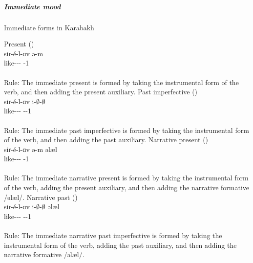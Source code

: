 \subparagraph{Immediate mood}



\begin{exe}
	\ex Immediate forms in Karabakh \label{sent:Karabakh:morpho:verb:Immediate}
	\begin{xlist}
		\ex Present ()\\\gll 
		siɾ-\'e-l-ɑv ə-m \\ 
		like-{\thgloss}-{\infgloss}-{\ins} {\aux}-1{\sg} \\ 
		\trans {}\\
		Rule: The immediate present is formed by taking the instrumental form of the verb, and then adding the present auxiliary. 
		\ex Past imperfective ()\\ \gll 
		siɾ-\'e-l-ɑv i-$\emptyset$-$\emptyset$ \\ 
		like-{\thgloss}-{\infgloss}-{\ins} {\aux}-{\pst}-1{\sg} \\ 
		\trans {}\\
		Rule: The immediate past imperfective is formed by taking the instrumental form of the verb, and then adding the past auxiliary. 
		\ex Narrative present () \\\gll 
		siɾ-\'e-l-ɑv ə-m əlæl \\ 
		like-{\thgloss}-{\infgloss}-{\ins} {\aux}-1{\sg} {\narr} \\ 
		\trans {}\\
		Rule: The immediate narrative present is formed by taking the instrumental form of the verb, adding the present auxiliary, and then adding the narrative formative /əlæl/. 
		\ex Narrative past ()\\ \gll 
		siɾ-\'e-l-ɑv i-$\emptyset$-$\emptyset$ əlæl \\ 
		like-{\thgloss}-{\infgloss}-{\ins} {\aux}-{\pst}-1{\sg} {\narr} \\ 
		\trans {}\\
		Rule: The immediate narrative past imperfective is formed by taking the instrumental form of the verb, adding the past auxiliary, and then adding the narrative formative /əlæl/. 
	\end{xlist}
	
	
\end{exe}

